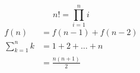 \documentclass{article}
\begin{document}
\begin{equation}
    n! = \prod_{i=1}^n i
\end{equation}
\begin{align}
    f(n) &= f(n-1) + f(n-2)\\
    \sum\limits_{k=1}^n k &= 1 + 2 + \dots + n \nonumber \\
        &= \frac{n(n+1)}{2}
\end{align}
\end{document}
